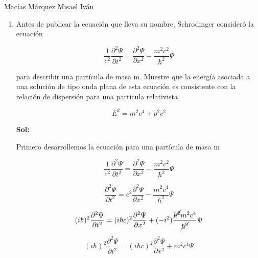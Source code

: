 \documentclass[12pt,a4paper]{article}
\begin{document}
Macías Márquez Misael Iván

\begin{enumerate}






    \item Antes de publicar la ecuación que lleva su nombre, Schrodinger consideró la ecuación
    
    \begin{equation*}
        \frac{1}{c^2} \frac{\partial^2 \Psi}{\partial t^2} = \frac{\partial^2 \Psi}{\partial x^2} - \frac{m^2 c^2}{\hbar ^2} \Psi
    \end{equation*}
    
    para describir una partícula de masa m. Muestre que la energía asociada a una solución de tipo onda plana de esta ecuación es consistente con la relación de dispersión para una partícula relativista
    
    \begin{equation*}
        E^2 = m^2 c^4 + p^2 c^2
    \end{equation*}
    
    \textbf{Sol:}
    
    Primero desarrollemos la ecuación para una partícula de masa m
    
    \begin{equation*}
        \frac{1}{c^2} \frac{\partial^2 \Psi}{\partial t^2} = \frac{\partial^2 \Psi}{\partial x^2} - \frac{m^2 c^2}{\hbar ^2} \Psi
    \end{equation*}
    
    \begin{equation*}
        \frac{\partial^2 \Psi}{\partial t^2} = c^2\frac{\partial^2 \Psi}{\partial x^2} - \frac{m^2 c^4}{\hbar ^2} \Psi
    \end{equation*}
    
    
    \begin{equation*}
        (i \hbar)^2\frac{\partial^2 \Psi}{\partial t^2} = (i\hbar c)^2\frac{\partial^2 \Psi}{\partial x^2} + (-i^2) \frac{\cancel{\hbar^2}m^2 c^4}{\cancel{\hbar ^2}} \Psi
    \end{equation*}
    
    \begin{equation*}
        (i \hbar)^2\frac{\partial^2 \Psi}{\partial t^2} = \left(i\hbar c\right)^2\frac{\partial^2 \Psi}{\partial x^2} + m^2 c^4 \Psi
    \end{equation*}
    

\end{enumerate}
\end{document}

